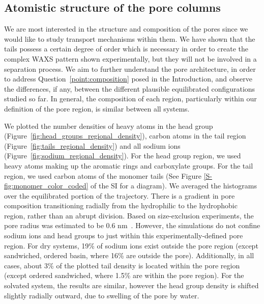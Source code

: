 \documentclass[journal=jpcbfk,manuscript=article]{achemso}
\begin{document}
  \subsection{Atomistic structure of the pore columns}\label{section:pore_composition}

  We are most interested in the structure and composition of the pores since we
  would like to study transport mechanisms within them. We have shown that the
  tails possess a certain degree of order which is necessary in order to create
  the complex WAXS pattern shown experimentally, but they will not be involved in
  a separation process. We aim to further understand the pore architecture, in
  order to address Question~\ref{point:composition} posed in the Introduction,
  and observe the differences, if any, between the different plausible
  equilibrated configurations studied so far. In general, the composition of each
  region, particularly within our definition of the pore region, is similar
  between all systems. 


  We plotted the number densities of heavy atoms in the head group
  (Figure~\ref{fig:head_groups_regional_density}), carbon atoms in the tail
  region (Figure~\ref{fig:tails_regional_density}) and all sodium ions
  (Figure~\ref{fig:sodium_regional_density}). For the head group region, we used
  heavy atoms making up the aromatic rings and carboxylate groups. For the tail
  region, we used carbon atoms of the monomer tails (See Figure
  \ref{S-fig:monomer_color_coded} of the SI for a diagram). We averaged the
  histograms over the equilibrated portion of the trajectory.  There is a
  gradient in pore composition transitioning radially from the hydrophilic to the
  hydrophobic region, rather than an abrupt division. Based on size-exclusion
  experiments, the pore radius was estimated to be 0.6
  nm~\cite{zhou_supported_2005}.  However, the simulations do not confine sodium
  ions and head groups to just within this experimentally-defined pore region.
  For dry systems, 19\% of sodium ions exist outside the pore region (except
  sandwiched, ordered basin, where 16\% are outside the pore). Additionally, in
  all cases, about 3\% of the plotted tail density is located within the pore
  region (except ordered sandwiched, where 1.5\% are within the pore region). For
  the solvated system, the results are similar, however the head group density is
  shifted slightly radially outward, due to swelling of the pore by water. 
\end{document}
